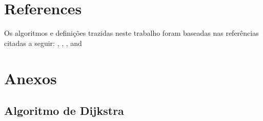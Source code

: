 \documentclass[12pt]{article}
\begin{document}
\section{References}

Os algoritmos e definições trazidas neste trabalho foram baseadas nas referências citadas a seguir: \cite{zivianiprojeto}, \cite{cormen},
\cite{bellmandford}, and \cite{bellmand}




\section{Anexos}
\subsection{Algoritmo de Dijkstra}
\end{document}
